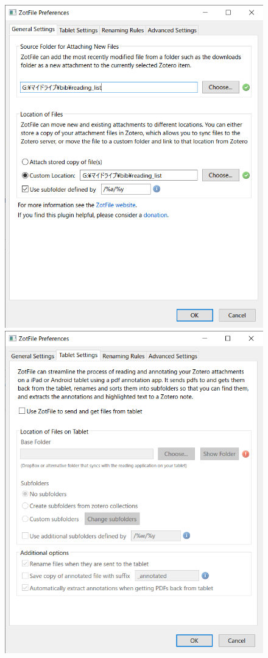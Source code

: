 \documentclass[a4paper,pdftex]{article}
\begin{document}
\begin{figure}[ht]
\begin{minipage}[ht]{0.19\columnwidth}
    \includegraphics[width=\columnwidth]{fig/zotero12.png}
  \end{minipage}
  \begin{minipage}[ht]{0.19\columnwidth}
    \centering
    \includegraphics[width=\columnwidth]{fig/zotero13.png}

\end{minipage}
\end{figure}
\end{document}
